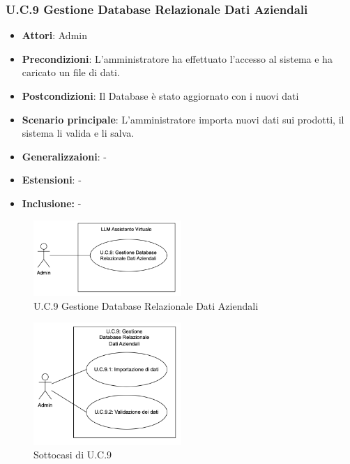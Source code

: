 \subsubsection{U.C.9 Gestione Database Relazionale Dati Aziendali}
\begin{itemize}
    \item \textbf{Attori}: Admin
    \item \textbf{Precondizioni}: L’amministratore ha effettuato l’accesso al sistema e ha caricato un file di dati.
    \item \textbf{Postcondizioni}: Il Database è stato aggiornato con i nuovi dati
    \item \textbf{Scenario principale}: L’amministratore importa nuovi dati sui prodotti, il sistema li valida e li salva.
    \item \textbf{Generalizzaioni}: -
    \item \textbf{Estensioni}: -
    \item \textbf{Inclusione:} -
\end{itemize}
\begin{figure}[h!]
    \centering
    \includegraphics[width=0.5\textwidth]{img/UC9.png}
    \caption{U.C.9 Gestione Database Relazionale Dati Aziendali}
\end{figure}
\begin{figure}[h!]
    \centering
    \includegraphics[width=0.5\textwidth]{img/UC9p1.png}
    \caption{Sottocasi di U.C.9}
\end{figure}

